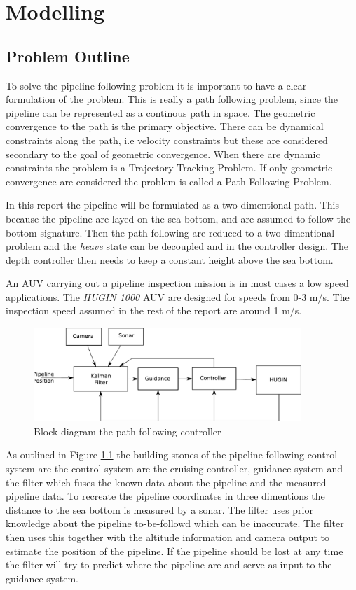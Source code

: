 \chapter{Modelling}
\section{Problem Outline}
\label{chap2:problem}
	To solve the pipeline following problem it is important to have a clear formulation of the problem.
	This is really a path following problem, since the pipeline can be represented as a continous path in
	space. The geometric convergence to the path is the primary objective. There can be dynamical
	constraints along the path, i.e velocity constraints but these are considered secondary to the goal of
	geometric convergence. When there are dynamic constraints the problem is a Trajectory Tracking
	Problem. If only geometric convergence are considered the problem is called a Path Following Problem.
	\cite{guidance-path-2d-3d}

	In this report the pipeline will be formulated as a two dimentional path. This because the pipeline
	are layed on the sea bottom, and are assumed to follow the bottom signature. Then the path following
	are reduced to a two dimentional problem and the \textit{heave} state can be decoupled and in the
	controller design. The depth controller then needs to keep a constant height above the sea bottom.

	An AUV carrying out a pipeline inspection mission is in most cases a low speed applications. The
	\textit{HUGIN 1000} AUV are designed for speeds from 0-3 m/s. The inspection speed assumed in the
	rest of the report are around 1 m/s.

	\begin{figure}[hbtp]
		\centering
		\includegraphics[width=0.9\textwidth]{pics/blockdiagram}
		\caption{Block diagram the path following controller}
		\label{fig:ch2-blockdiagram}
	\end{figure}
	As outlined in Figure \ref{fig:ch2-blockdiagram} the building stones of the  pipeline following
	control system are the control system are the cruising controller, guidance system and the filter
	which fuses the known data about the pipeline and the measured pipeline data. To recreate the 
	pipeline coordinates in three dimentions the distance to the sea bottom is measured by a sonar. The
	filter uses prior knowledge about the pipeline to-be-followd which can be inaccurate. The filter then
	uses this together with the altitude information and camera output to estimate the position of the
	pipeline. If the pipeline should be lost at any time the filter will try to predict where the pipeline
	are and serve as input to the guidance system.

